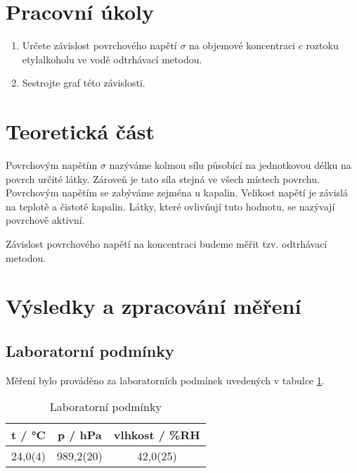 \section{Pracovní úkoly}

\begin{enumerate}
\item Určete závislost povrchového napětí \(\sigma\) na objemové koncentraci \(c\) roztoku etylalkoholu ve vodě odtrhávací metodou.

\item Sestrojte graf této závislosti.

\end{enumerate}

\section{Teoretická část}

Povrchovým napětím \(\sigma\) nazýváme kolmou sílu působící na jednotkovou délku na povrch určité látky. Zároveň je tato síla stejná ve všech místech povrchu. Povrchovým napětím se zabýváme zejména u kapalin. Velikost napětí je závislá na teplotě a čistotě kapalin. Látky, které ovlivňují tuto hodnotu, se nazývají povrchově aktivní.

Závislost povrchového napětí na koncentraci budeme měřit tzv. odtrhávací metodou.

\section{Výsledky a zpracování měření}

\subsection{Laboratorní podmínky}

    Měření bylo prováděno za laboratorních podmínek uvedených v tabulce \ref{tab:lab_pod}.

    \begin{table}[h]
        \centering
        \begin{tabular}{|c|c|c|} 
        \hline
            t / °C & p / hPa & vlhkost / \%RH  \\ 
        \hline
            24,0(4)   & 989,2(20)   & 42,0(25)            \\
        \hline
        \end{tabular}
        \caption{Laboratorní podmínky}
        \label{tab:lab_pod}
    \end{table}

